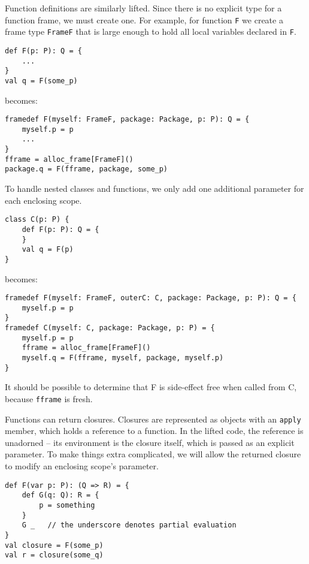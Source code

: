 \documentclass[letterpaper,11pt]{article}
\newcommand{\code}[1]{\lstinline$#1$}
\begin{document}
Function definitions are similarly lifted. Since there is no explicit type
for a function frame, we must create one. For example, for function \code{F}
we create a frame type \code{FrameF} that is large enough to hold all local variables
declared in \code{F}.

\begin{lstlisting}
def F(p: P): Q = {
	...
}
val q = F(some_p)
\end{lstlisting}

becomes:

\begin{lstlisting}
framedef F(myself: FrameF, package: Package, p: P): Q = {
	myself.p = p
	...
}
fframe = alloc_frame[FrameF]()
package.q = F(fframe, package, some_p)
\end{lstlisting}

\pagebreak

To handle nested classes and functions, we only add one additional parameter for
each enclosing scope.

\begin{lstlisting}
class C(p: P) {
	def F(p: P): Q = {
	}
	val q = F(p)
}
\end{lstlisting}

becomes:

\begin{lstlisting}
framedef F(myself: FrameF, outerC: C, package: Package, p: P): Q = {
	myself.p = p
}
framedef C(myself: C, package: Package, p: P) = {
	myself.p = p
	fframe = alloc_frame[FrameF]()
	myself.q = F(fframe, myself, package, myself.p)
}
\end{lstlisting}

It should be possible to determine that F is side-effect free when called from C,
because \code{fframe} is fresh.

Functions can return closures.
Closures are represented as objects with an \code{apply} member,
which holds a reference to a function.
In the lifted code, the reference is unadorned -- its environment is
the closure itself, which is passed as an explicit parameter.
To make things extra complicated, we will allow the returned
closure to modify an enclosing scope's parameter.

\begin{lstlisting}
def F(var p: P): (Q => R) = {
	def G(q: Q): R = {
		p = something
	}
	G _   // the underscore denotes partial evaluation
}
val closure = F(some_p)
val r = closure(some_q)
\end{lstlisting}
\end{document}
